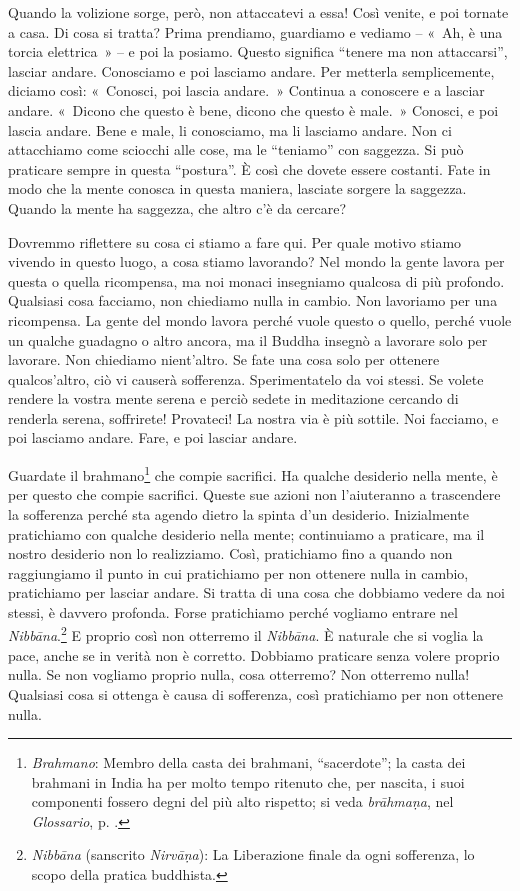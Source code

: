 Quando la volizione sorge, però, non attaccatevi a essa! Così venite, e
poi tornate a casa. Di cosa si tratta? Prima prendiamo, guardiamo e
vediamo -- «~Ah, è una torcia elettrica~» -- e poi la posiamo. Questo
significa ``tenere ma non attaccarsi'', lasciar andare. Conosciamo e poi
lasciamo andare. Per metterla semplicemente, diciamo così: «~Conosci,
poi lascia andare.~» Continua a conoscere e a lasciar andare. «~Dicono
che questo è bene, dicono che questo è male.~» Conosci, e poi lascia
andare. Bene e male, li conosciamo, ma li lasciamo andare. Non ci
attacchiamo come sciocchi alle cose, ma le ``teniamo'' con saggezza. Si
può praticare sempre in questa ``postura''. È così che dovete essere
costanti. Fate in modo che la mente conosca in questa maniera, lasciate
sorgere la saggezza. Quando la mente ha saggezza, che altro c'è da
cercare?

Dovremmo riflettere su cosa ci stiamo a fare qui. Per quale motivo
stiamo vivendo in questo luogo, a cosa stiamo lavorando? Nel mondo la
gente lavora per questa o quella ricompensa, ma noi monaci insegniamo
qualcosa di più profondo. Qualsiasi cosa facciamo, non chiediamo nulla
in cambio. Non lavoriamo per una ricompensa. La gente del mondo lavora
perché vuole questo o quello, perché vuole un qualche guadagno o altro
ancora, ma il Buddha insegnò a lavorare solo per lavorare. Non chiediamo
nient'altro. Se fate una cosa solo per ottenere qualcos'altro, ciò vi
causerà sofferenza. Sperimentatelo da voi stessi. Se volete rendere la
vostra mente serena e perciò sedete in meditazione cercando di renderla
serena, soffrirete! Provateci! La nostra via è più sottile. Noi
facciamo, e poi lasciamo andare. Fare, e poi lasciar andare.

Guardate il brahmano\footnote{\emph{Brahmano}: Membro della casta dei brahmani,
  ``sacerdote''; la casta dei brahmani in India ha per molto tempo
  ritenuto che, per nascita, i suoi componenti fossero degni del più
  alto rispetto; si veda \emph{brāhmaṇa}, nel \emph{Glossario}, p. \pageref{glossary-brahmana}.} che
compie sacrifici. Ha qualche desiderio nella mente, è per questo che
compie sacrifici. Queste sue azioni non l'aiuteranno a trascendere la
sofferenza perché sta agendo dietro la spinta d'un desiderio.
Inizialmente pratichiamo con qualche desiderio nella mente; continuiamo
a praticare, ma il nostro desiderio non lo realizziamo. Così,
pratichiamo fino a quando non raggiungiamo il punto in cui pratichiamo
per non ottenere nulla in cambio, pratichiamo per lasciar andare. Si
tratta di una cosa che dobbiamo vedere da noi stessi, è davvero
profonda. Forse pratichiamo perché vogliamo entrare nel
\emph{Nibbāna}.\footnote{\emph{Nibbāna} (sanscrito \emph{Nirvāṇa}): La
  Liberazione finale da ogni sofferenza, lo scopo della pratica
  buddhista.} E proprio così non otterremo il \emph{Nibbāna}. È naturale
che si voglia la pace, anche se in verità non è corretto. Dobbiamo
praticare senza volere proprio nulla. Se non vogliamo proprio nulla,
cosa otterremo? Non otterremo nulla! Qualsiasi cosa si ottenga è causa
di sofferenza, così pratichiamo per non ottenere nulla.

